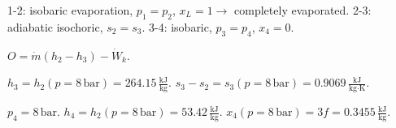 1-2: isobaric evaporation, \( p_1 = p_2 \), \( x_L = 1 \rightarrow \) completely evaporated.  
2-3: adiabatic isochoric, \( s_2 = s_3 \).  
3-4: isobaric, \( p_3 = p_4 \), \( x_4 = 0 \).  

\( O = \dot{m} (h_2 - h_3) - \dot{W}_k \).  

\( h_3 = h_2 (p = 8 \, \text{bar}) = 264.15 \, \frac{\text{kJ}}{\text{kg}} \).  
\( s_3 - s_2 = s_3 (p = 8 \, \text{bar}) = 0.9069 \, \frac{\text{kJ}}{\text{kg·K}} \).  

\( p_4 = 8 \, \text{bar} \).  
\( h_4 = h_2 (p = 8 \, \text{bar}) = 53.42 \, \frac{\text{kJ}}{\text{kg}} \).  
\( x_4 (p = 8 \, \text{bar}) = 3f = 0.3455 \, \frac{\text{kJ}}{\text{kg}} \).